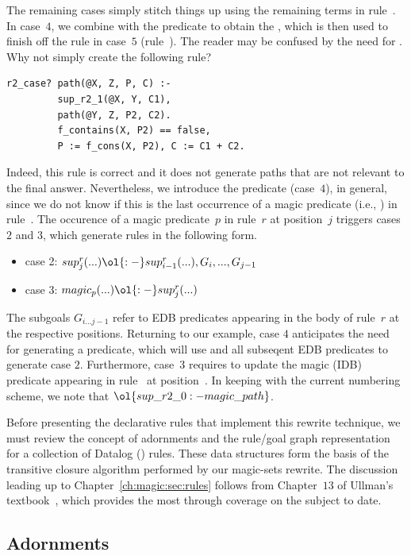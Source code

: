 The remaining cases simply stitch things up using the remaining terms in
rule~.  In case~$4$, we combine  with the 
predicate to obtain the , which is then used to finish off the
rule in case~$5$ (rule~).  The reader may be confused by the need
for . Why not simply create the following rule? 
\begin{lstlisting}
r2_case? path(@X, Z, P, C) :-
         sup_r2_1(@X, Y, C1),
         path(@Y, Z, P2, C2).
         f_contains(X, P2) == false,
         P := f_cons(X, P2), C := C1 + C2.
\end{lstlisting}
Indeed, this rule is correct and it does not generate paths that are not relevant to
the final answer.  Nevertheless, we introduce the  predicate
(case~$4$), in general, since we do not know if this is the last occurrence of
a magic predicate (i.e., ) in rule~.  The occurence of a magic
predicate~$p$ in rule~$r$ at position~$j$ triggers cases $2$ and $3$, which
generate rules in the following form.
\begin{itemize}
  \item case 2: $sup^r_j(...) \ol{:-} sup^r_{i-1}(...), G_i, ..., G_{j-1}$
  \item case 3: $magic_p(...) \ol{:-} sup^r_j(...)$
\end{itemize}
The subgoals $G_{i...j-1}$ refer to EDB predicates appearing in the body of
rule~$r$ at the respective positions.  Returning to our example, case $4$
anticipates the need for generating a  predicate, which will use
 and all subseqent EDB predicates to generate case $2$.
Furthermore, case~$3$ requires  to update the magic (IDB)
predicate appearing in rule~ at position~.  In keeping with the
current numbering scheme, we note that $\ol{sup\_r2\_0 :- magic\_path}$.

Before presenting the declarative rules that implement this rewrite technique,
we must review the concept of adornments and the rule/goal graph representation
for a collection of Datalog (\OVERLOG) rules.  These data structures form the
basis of the transitive closure algorithm performed by our magic-sets rewrite.
The discussion leading up to Chapter~\ref{ch:magic:sec:rules} follows from
Chapter~$13$ of Ullman's textbook~\cite{ullmanbook}, which provides the most
through coverage on the subject to date.


\subsection{Adornments}

